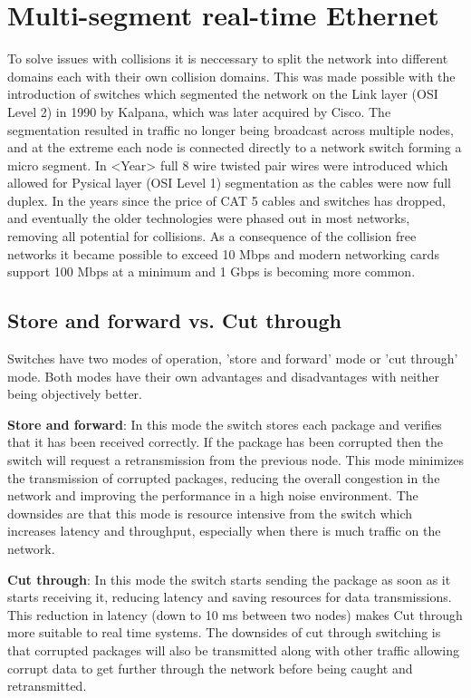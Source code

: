 \section{Multi-segment real-time Ethernet}


To solve issues with collisions it is neccessary to split the network into different domains each with their own collision domains. This was made possible with the introduction of switches which segmented the network on the Link layer (OSI Level 2) in 1990 by Kalpana, which was later acquired by Cisco. The segmentation resulted in traffic no longer being broadcast across multiple nodes, and at the extreme each node is connected directly to a network switch forming a micro segment. In <Year> full 8 wire twisted pair wires were introduced which allowed for Pysical layer (OSI Level 1) segmentation as the cables were now full duplex. In the years since the price of CAT 5 cables and switches has dropped, and eventually the older technologies were phased out in most networks, removing all potential for collisions. As a consequence of the collision free networks it became possible to exceed 10 Mbps and modern networking cards support 100 Mbps at a minimum and 1 Gbps is becoming more common.

\subsection{Store and forward vs. Cut through}

Switches have two modes of operation, 'store and forward' mode or 'cut through' mode. Both modes have their own advantages and disadvantages with neither being objectively better. 

\noindent \textbf{Store and forward}: In this mode the switch stores each package and verifies that it has been received correctly. If the package has been corrupted then the switch will request a retransmission from the previous node. This mode minimizes the transmission of corrupted packages, reducing the overall congestion in the network and improving the performance in a high noise environment. The downsides are that this mode is resource intensive from the switch which increases latency and throughput, especially when there is much traffic on the network.

\noindent \textbf{Cut through}: In this mode the switch starts sending the package as soon as it starts receiving it, reducing latency and saving resources for data transmissions. This reduction in latency (down to 10 ms between two nodes) makes Cut through more suitable to real time systems. The downsides of cut through switching is that corrupted packages will also be transmitted along with other traffic allowing corrupt data to get further through the network before being caught and retransmitted. 


